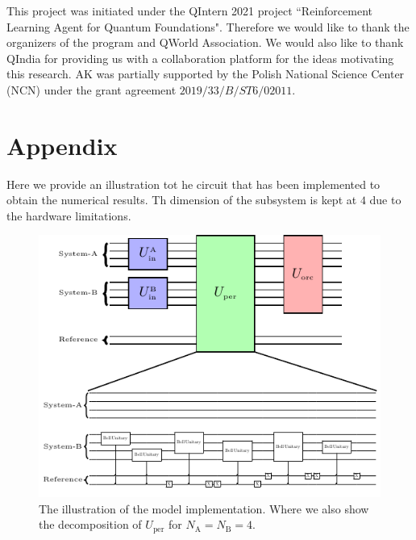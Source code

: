 \documentclass[%
 aps,
 jmp,%
 amsmath,amssymb,
 reprint,%
]{revtex4-2}
\begin{document}
\begin{acknowledgments}
This project was initiated under the QIntern 2021 project ``Reinforcement Learning Agent for Quantum Foundations".
Therefore we would like to thank the organizers of the program and QWorld Association. 
We would also like to thank QIndia for providing us with a collaboration platform for the ideas motivating this research.
AK was partially supported by the Polish National Science Center (NCN) under the grant agreement $2019/33/B/ST6/02011$.
\end{acknowledgments}

\appendix

\section{Appendix}
Here we provide an illustration tot he circuit that has been implemented to obtain the numerical results. Th dimension of the subsystem is kept at $4$ due to the hardware limitations.
\begin{figure}[t!]
	\centering
	\includegraphics[width = 0.7\linewidth]{plot/bortoni.pdf}
	\caption{The illustration of the model implementation. Where we also show the decomposition of $U_\textrm{per}$ for $ N_\textrm{A} = N_\textrm{B} = 4$.}
	\label{fig:perm-circuit}
\end{figure}

\nocite{*}
\end{document}
